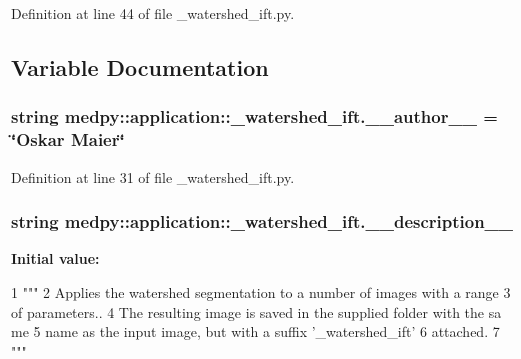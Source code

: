 Definition at line 44 of file \_\-watershed\_\-ift.py.



\subsection{Variable Documentation}
\hypertarget{namespacemedpy_1_1application_1_1__watershed__ift_aac2d8e316506ddea703b2822fdb566c1}{
\subsubsection[{\_\-\_\-author\_\-\_\-}]{\setlength{\rightskip}{0pt plus 5cm}string {\bf medpy::application::\_\-watershed\_\-ift.\_\-\_\-author\_\-\_\-} = \char`\"{}Oskar Maier\char`\"{}}}
\label{namespacemedpy_1_1application_1_1__watershed__ift_aac2d8e316506ddea703b2822fdb566c1}


Definition at line 31 of file \_\-watershed\_\-ift.py.

\hypertarget{namespacemedpy_1_1application_1_1__watershed__ift_acda2bfa5a19022cc907c4e1e6ab55468}{
\subsubsection[{\_\-\_\-description\_\-\_\-}]{\setlength{\rightskip}{0pt plus 5cm}string {\bf medpy::application::\_\-watershed\_\-ift.\_\-\_\-description\_\-\_\-}}}
\label{namespacemedpy_1_1application_1_1__watershed__ift_acda2bfa5a19022cc907c4e1e6ab55468}
{\bfseries Initial value:}
\begin{DoxyCode}
1 """
2                   Applies the watershed segmentation to a number of images with a
       range
3                   of parameters..
4                   The resulting image is saved in the supplied folder with the sa
      me
5                   name as the input image, but with a suffix '_watershed_ift'
6                   attached.
7                   """
\end{DoxyCode}


